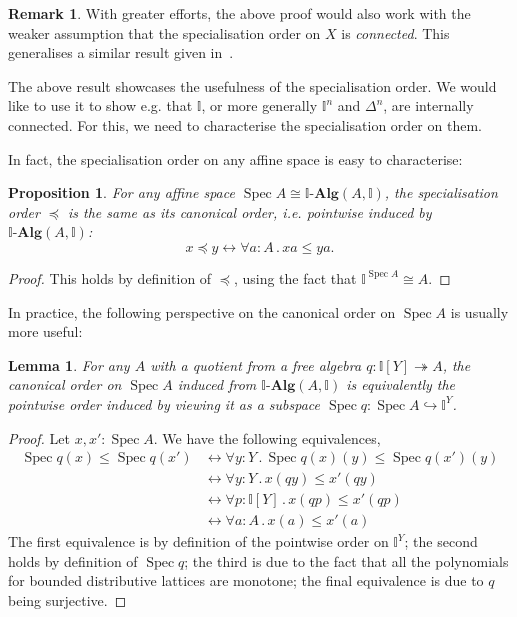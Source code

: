 \documentclass[a4paper,12pt]{amsart}
\newtheorem{lemma}[theorem]{Lemma}
\newtheorem{proposition}[theorem]{Proposition}
\theoremstyle{definition}
\newtheorem{remark}[theorem]{Remark}
\newcommand{\mb}[1]{\mathbf{#1}}
\newcommand{\mbb}[1]{\mathbb{#1}}
\newcommand{\I}{\mbb I}
\newcommand{\alg}{\text{-}\mb{Alg}}
\newcommand{\surj}{\twoheadrightarrow}
\newcommand{\hook}{\hookrightarrow}
\newcommand{\fa}[2]{\forall #1\!\colon\!\!#2\mathpunct{.}}
\newcommand{\eq}{\leftrightarrow}
\newcommand{\spec}{\operatorname{Spec}}
\begin{document}
\begin{remark}
  With greater efforts, the above proof would also work with the weaker assumption that the specialisation order on $X$ is \emph{connected}. This generalises a similar result given in~\cite[Prop.~4.4.1]{hyland1990first}.
\end{remark}

The above result showcases the usefulness of the specialisation order. We would like to use it to show e.g. that $\I$, or more generally $\I^n$ and $\Delta^n$, are internally connected. For this, we need to characterise the specialisation order on them. 

In fact, the specialisation order on any affine space is easy to characterise:


\begin{proposition}\label{lem:specorderofaffine}
  For any affine space $\spec A \cong \I\alg(A,\I)$, the specialisation order $\preceq$ is the same as its canonical order, i.e. pointwise induced by $\I\alg(A,\I)$:
  \[ x \preceq y \eq \fa aA xa \le ya. \]
\end{proposition}
\begin{proof}
  This holds by definition of $\preceq$, using the fact that $\I^{\spec A} \cong A$.
\end{proof}

In practice, the following perspective on the canonical order on $\spec A$ is usually more useful:

\begin{lemma}\label{lem:cancoincide}
  For any $A$ with a quotient from a free algebra $q : \I[Y] \surj A$, the canonical order on $\spec A$ induced from $\I\alg(A,\I)$ is equivalently the pointwise order induced by viewing it as a subspace $\spec q : \spec A \hook \I^Y$.
\end{lemma}
\begin{proof}
  Let $x,x' : \spec A$. We have the following equivalences,
  \begin{align*}
    \spec q(x) \le \spec q(x') 
    &\eq \fa yY \spec q(x)(y) \le \spec q(x')(y) \\
    &\eq \fa yY x(qy) \le x'(qy) \\
    &\eq \fa p{\I[Y]} x(qp) \le x'(qp) \\
    &\eq \fa aA x(a) \le x'(a)
  \end{align*}
  The first equivalence is by definition of the pointwise order on $\I^Y$; the second holds by definition of $\spec q$; the third is due to the fact that all the polynomials for bounded distributive lattices are monotone; the final equivalence is due to $q$ being surjective.
\end{proof}
\end{document}
